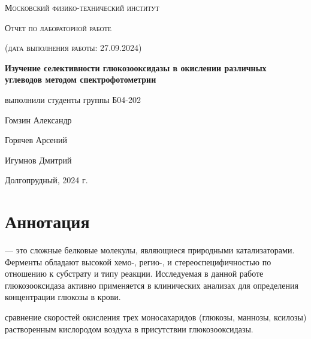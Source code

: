 \documentclass[a4paper]{article}
\begin{document}
\begin{titlepage}
	\centering
	\vspace{5cm}
	{\scshape\LARGE Московский физико-технический институт \par}
	\vspace{4cm}
	{\scshape\Large Отчет по лабораторной работе \par}
        {\scshape\large (дата выполнения работы: 27.09.2024) \par}
	\vspace{1cm}
	{\huge\bfseries Изучение селективности глюкозооксидазы в окислении различных углеводов методом спектрофотометрии \par}
	\vspace{1cm}
	\vfill
\begin{flushright}
	{\large выполнили студенты группы Б04-202}\par
	\vspace{0.3cm}
	{\LARGE Гомзин Александр} \par
		\vspace{0.3cm}
	{\LARGE Горячев Арсений} \par
        \vspace{0.3cm}
        {\LARGE Игумнов Дмитрий} \par
\end{flushright}
	

	\vfill

	Долгопрудный, 2024 г.
\end{titlepage}

	\thispagestyle{empty}


	\newpage \LARGE
	
		\tableofcontents %
	
	\newpage
\par
\section{\LARGE \textbf{Аннотация}}
\par \hspace{0.33 cm} \large
\textit{} --- это сложные белковые молекулы, являющиеся природными катализаторами. Ферменты обладают высокой хемо-, регио-, и стереоспецифичностью по отношению к субстрату и типу реакции. Исследуемая в данной работе глюкозооксидаза активно применяется в клинических анализах для определения концентрации глюкозы в крови. 

\par \vspace{0.2 cm}
\textbf{} сравнение скоростей окисления трех моносахаридов (глюкозы, маннозы, ксилозы) растворенным кислородом воздуха в присутствии глюкозооксидазы.
\end{document}
